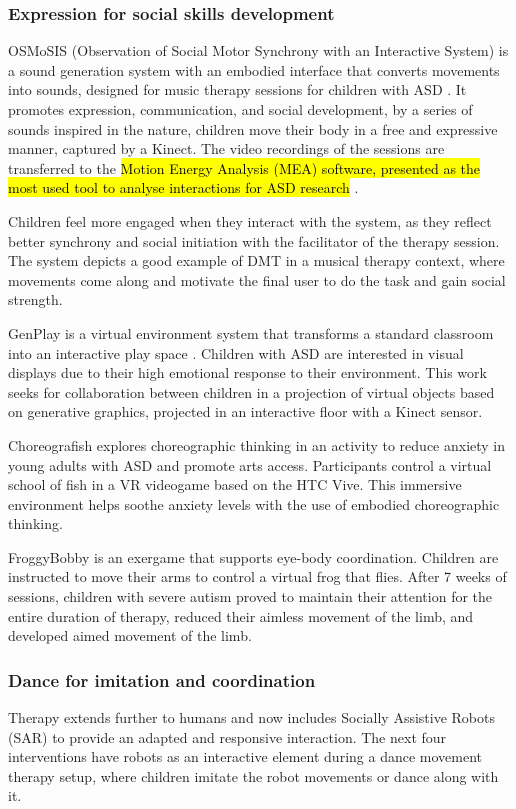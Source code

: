 \documentclass[a4paper,fleqn]{cas-sc}
\begin{document}
\subsubsection{Expression for social skills development} 

OSMoSIS (Observation of Social Motor Synchrony with an Interactive System) is a sound generation system with an embodied interface that converts movements into sounds, designed for music therapy sessions for children with ASD \cite{Ragone20, Osmosis20}. It promotes expression, communication, and social development, by a series of sounds inspired in the nature, children move their body in a free and expressive manner, captured by a Kinect. The video recordings of the sessions are transferred to the \hl{Motion Energy Analysis (MEA) software, presented as the most used tool to analyse interactions for ASD research} \cite{Ragone22}.

Children feel more engaged when they interact with the system, as they reflect better synchrony and social initiation with the facilitator of the therapy session. The system depicts a good example of DMT in a musical therapy context, where movements come along and motivate the final user to do the task and gain social strength.

GenPlay is a virtual environment system that transforms a standard classroom into an interactive play space \cite{Crowell18}. Children with ASD are interested in visual displays due to their high emotional response to their environment. This work seeks for collaboration between children in a projection of virtual objects based on generative graphics, projected in an interactive floor with a Kinect sensor.

Choreografish explores choreographic thinking in an activity to reduce anxiety in young adults with ASD \cite{AltizerJr18} and promote arts access. Participants control a virtual school of fish in a VR videogame based on the HTC Vive. This immersive environment helps soothe anxiety levels with the use of embodied choreographic thinking.

FroggyBobby is an exergame that supports eye-body coordination\cite{Caro17}. Children are instructed to move their arms to control a virtual frog that flies. After 7 weeks of sessions, children with severe autism proved to maintain their attention for the entire duration of therapy, reduced their aimless movement of the limb, and developed aimed movement of the limb.


\subsubsection{Dance for imitation and coordination}  %
Therapy extends further to humans and now includes Socially Assistive Robots (SAR) to provide an adapted and responsive interaction. The next four interventions have robots as an interactive element during a dance movement therapy setup, where children imitate the robot movements or dance along with it.
\end{document}
